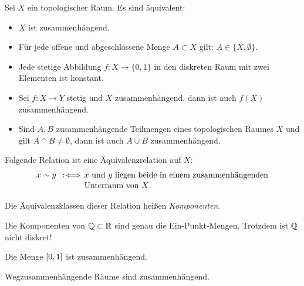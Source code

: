 \documentclass{cheat-sheet}
\begin{document}
\begin{prop}
  Sei $X$ ein topologischer Raum. Es sind äquivalent:
  \begin{itemize}
    \item $X$ ist zusammenhängend.
    \item Für jede offene und abgeschlossene Menge $A \subset X$ gilt: $A \in \{ X, \emptyset \}$.
    \item Jede stetige Abbildung $f : X \to \{ 0, 1 \}$ in den diskreten Raum mit zwei Elementen ist konstant.
  \end{itemize}
\end{prop}

\begin{prop}
  \begin{itemize}
    \item Sei $f : X \to Y$ stetig und $X$ zusammenhängend, dann ist auch $f(X)$ zusammenhängend.
    \item Sind $A, B$ zusammenhängende Teilmengen eines topologischen Raumes $X$ und gilt $A \cap B \not= \emptyset$, dann ist auch $A \cup B$ zusammenhängend.
  \end{itemize}
\end{prop}

\begin{kor}
  Folgende Relation ist eine Äquivalenzrelation auf $X$:
  \begin{align*}
    x \sim y \enspace:\!\iff \, &\text{$x$ und $y$ liegen beide in einem zusammenhängenden}\\[-2pt]
    &\text{Unterraum von $X$.}
  \end{align*}
\end{kor}

\begin{defn}
  Die Äquivalenzklassen dieser Relation heißen \emph{Komponenten}. %
\end{defn}

\begin{bsp}
  Die Komponenten von $\mathbb{Q} \subset \mathbb{R}$ sind genau die Ein-Punkt-Mengen. Trotzdem ist $\mathbb{Q}$ nicht diskret!
\end{bsp}

\begin{prop}
  Die Menge $\left[ 0, 1 \right]$ ist zusammenhängend.
\end{prop}

\begin{kor}
  Wegzusammenhängende Räume sind zusammenhängend.
\end{kor}
\end{document}
